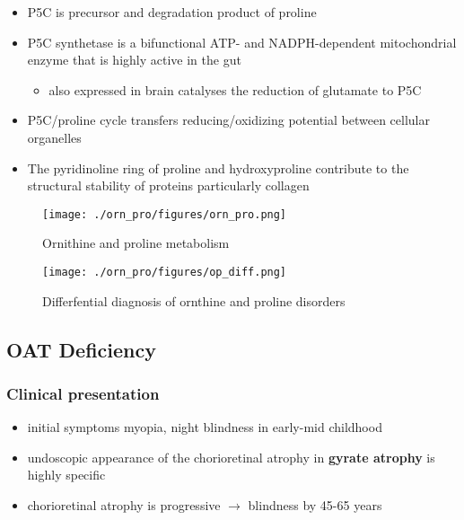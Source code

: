 \documentclass{scrartcl}
\begin{document}
\begin{itemize}
\begin{itemize}
\item {}
\end{itemize}
\item P5C is precursor and degradation product of proline
\item P5C synthetase is a bifunctional ATP- and NADPH-dependent
mitochondrial enzyme that is highly active in the gut
\begin{itemize}
\item also expressed in brain catalyses the reduction of glutamate to
P5C
\end{itemize}
\item P5C/proline cycle transfers reducing/oxidizing potential between
cellular organelles
\item The pyridinoline ring of proline and hydroxyproline contribute to
the structural stability of proteins particularly collagen
\end{itemize}

\begin{figure}[htbp]
\centering
\texttt{[image: ./orn\_pro/figures/orn\_pro.png]}
\caption{\label{fig:orgd481434}
Ornithine and proline metabolism}
\end{figure}

\begin{figure}[htbp]
\centering
\texttt{[image: ./orn\_pro/figures/op\_diff.png]}
\caption{\label{fig:org047367e}
Differfential diagnosis of ornthine and proline disorders}
\end{figure}

\subsection{OAT Deficiency}
\label{sec:org3da98e3}
\subsubsection{Clinical presentation}
\label{sec:org4b69396}
\begin{itemize}
\item initial symptoms myopia, night blindness in early-mid childhood
\item undoscopic appearance of the chorioretinal atrophy in \textbf{gyrate atrophy} is highly specific
\item chorioretinal atrophy is progressive \(\to\) blindness by 45-65 years
\end{itemize}
\end{document}
